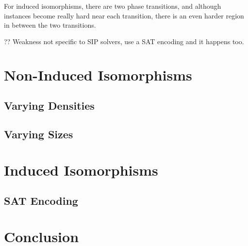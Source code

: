 \documentclass[letterpaper]{article}
\begin{document}
For induced isomorphisms, there are two phase transitions, and although instances become really hard
near each transition, there is an even harder region in between the two transitions.

?? Weakness not specific to SIP solvers, use a SAT encoding and it happens too.

\section{Non-Induced Isomorphisms}

\subsection{Varying Densities}

\subsection{Varying Sizes}

\section{Induced Isomorphisms}

\subsection{SAT Encoding}

\section{Conclusion}



\end{document}
